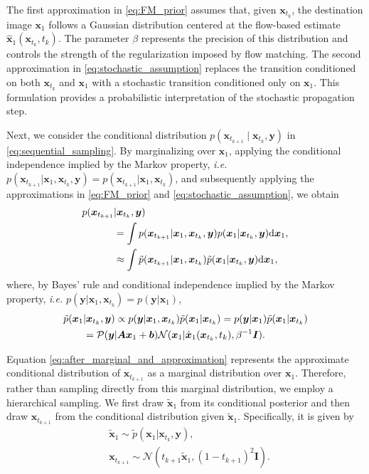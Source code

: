 \documentclass[journal]{IEEEtran}
\begin{document}
The first approximation in \eqref{eq:FM_prior} assumes that, given $\bm x_{t_k}$, the destination image $\bm x_1$ follows a Gaussian distribution centered at the flow-based estimate $\hat{\bm x}_1(\bm x_{t_k},t_k)$. The parameter $\beta$ represents the precision of this distribution and controls the strength of the regularization imposed by flow matching.
The second approximation in \eqref{eq:stochastic_assumption} replaces the transition conditioned on both $\bm x_{t_k}$ and $\bm x_1$ with a stochastic transition conditioned only on $\bm x_1$. This formulation provides a probabilistic interpretation of the stochastic propagation step.

Next, we consider the conditional distribution $p(\bm x_{t_{k+1}} \mid \bm x_{t_k}, \bm y)$ in \eqref{eq:sequential_sampling}.
By marginalizing over $\bm x_1$, applying the conditional independence implied by the Markov property, {\em i.e.} $p(\bm x_{t_{k+1}} | \bm x_1, \bm x_{t_k}, \bm y)=p(\bm x_{t_{k+1}} | \bm x_1, \bm x_{t_k})$, and subsequently applying the approximations in \eqref{eq:FM_prior} and \eqref{eq:stochastic_assumption}, we obtain
\begin{align}
p(\bm x_{t_{k+1}} &| \bm x_{t_k}, \bm y) \notag \\
&= \int p(\bm x_{t_{k+1}} | \bm x_1, \bm x_{t_k}, \bm y) p(\bm x_1 | \bm x_{t_k}, \bm y) \mathrm d \bm x_1, \\
&\approx \int \tilde{p}(\bm x_{t_{k+1}} | \bm x_1, \bm x_{t_k}) \tilde{p}(\bm x_1 | \bm x_{t_k}, \bm y)\mathrm d \bm x_1,\label{eq:after_marginal_and_approximation}
\end{align}
where, by Bayes' rule and conditional independence implied by the Markov property, {\em i.e.} $p(\bm y | \bm x_1, \bm x_{t_k})= p(\bm y | \bm x_1)$,
\begin{align}
\tilde{p}(\bm x_1 &| \bm x_{t_k}, \bm y) \propto p(\bm y | \bm x_1, \bm x_{t_k}) \tilde{p}(\bm x_1 | \bm x_{t_k})= p(\bm y | \bm x_1) \tilde{p}(\bm x_1 | \bm x_{t_k}) \notag \\
&=\mathcal{P}(\bm y | \bm A \bm x_1 + \bm b)\mathcal{N}(\bm x_1|\hat{\bm x}_1(\bm x_{t_k},t_k), \beta^{-1} \bm I).
\label{eq:conditional_posterior}
\end{align}

Equation \eqref{eq:after_marginal_and_approximation} represents the approximate conditional distribution of $\bm x_{t_{k+1}}$ as a marginal distribution over $\bm x_1$.
Therefore, rather than sampling directly from this marginal distribution, we employ a hierarchical sampling. 
We first draw $\tilde{\bm x}_1$ from its conditional posterior and then draw $\bm x_{t_{k+1}}$ from the conditional distribution given $\tilde{\bm x}_1$. Specifically, it is given by
\begin{align}
&\tilde{\bm x}_1 \sim \tilde{p}(\bm x_1 | \bm x_{t_k}, \bm y), \label{eq:MAP_procedure} \\
&\bm x_{t_{k+1}} \sim \mathcal{N}(t_{k+1}\tilde{\bm x}_1, (1-t_{k+1})^2 \bm I). \label{eq:stochastic_procedure}
\end{align}
\end{document}
